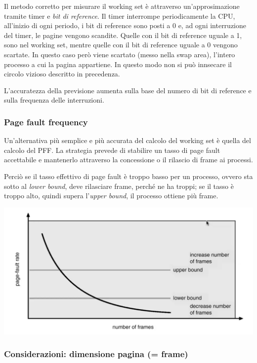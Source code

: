 \documentclass[a4paper,12pt, twoside]{report}
\begin{document}
Il metodo corretto per misurare il working set \`e attraverso un'approsimazione tramite timer e \emph{bit di 
reference}. Il timer interrompe periodicamente la CPU, all'inizio di ogni periodo, i bit di reference sono posti a 0 e, 
ad ogni interruzione del timer, le pagine vengono scandite. Quelle con il bit di reference uguale a 1, sono nel working set, 
mentre quelle con il bit di reference uguale a 0 vengono scartate. In questo caso per\`o viene scartato (messo nella swap area), 
l'intero processo a cui la pagina appartiene. In questo modo non si pu\`o innsecare il circolo vizioso descritto in precedenza. 

L'accuratezza della previsione aumenta sulla base del numero di bit di reference e sulla frequenza delle interruzioni. 

\subsubsection{Page fault frequency}

Un'alternativa pi\`u semplice e pi\`u accurata del calcolo del working set \`e quella 
del calcolo del PFF. La strategia prevede di stabilire un tasso di page fault accettabile e mantenerlo attraverso 
la concessione o il rilascio di frame ai processi. 

Perci\`o se il tasso effettivo di page fault \`e troppo 
basso per un processo, ovvero sta sotto al \emph{lower bound}, deve rilasciare frame, perch\'e ne 
ha troppi; se il tasso \`e troppo alto, quindi supera l'\emph{upper bound}, il processo ottiene pi\`u frame. 

\begin{center}
    \includegraphics[scale=0.2]{pff_graph}
\end{center}

\subsubsection{Considerazioni: dimensione pagina (= frame)}
\end{document}
